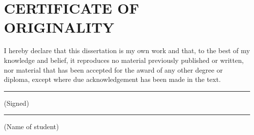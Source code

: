 \chapter*{\Large CERTIFICATE OF ORIGINALITY}
I hereby declare that this dissertation is my own work and that, to the best of my knowledge and belief, it reproduces no material previously published or written, nor material that has been accepted for the award of any other degree or diploma, except where due acknowledgement has been made in the text.

\vspace{25mm}
\noindent\rule{95mm}{0.4pt} (Signed)

\vspace{15mm}
\noindent\rule{95mm}{0.4pt} (Name of student)
\clearpage

